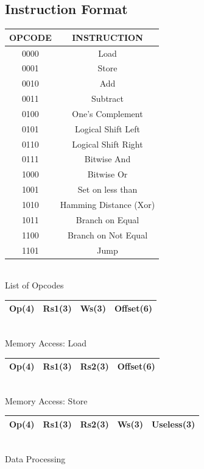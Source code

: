 \documentclass[conference]{IEEEtran}
\begin{document}
\subsection{Instruction Format}
\vspace{5mm}
\begin{center}
\begin{tabular}{ |c|c| } 

 \hline
 OPCODE & INSTRUCTION \\ 
 \hline
 0000 & Load \\ 
 0001 & Store \\
 0010 & Add \\ 
 0011 & Subtract \\ 
 0100 & One's Complement \\ 
 0101 & Logical Shift Left \\ 
 0110 & Logical Shift Right \\ 
 0111 & Bitwise And \\ 
 1000 & Bitwise Or \\ 
 1001 & Set on less than \\ 
 1010 & Hamming Distance (Xor) \\ 
 1011 & Branch on Equal \\ 
 1100 & Branch on Not Equal \\ 
 1101 & Jump \\ 
 \hline
\end{tabular}
\vspace{2mm}
\\List of Opcodes
\end{center}
\vspace{5mm}
\begin{center}
\begin{tabular}{ |c|c|c|c| } 
 \hline
 Op(4) & Rs1(3) & Ws(3) & Offset(6)\\
 \hline
\end{tabular}
\\Memory Access: Load
\end{center}
\vspace{5mm}
\begin{center}
\begin{tabular}{ |c|c|c|c| } 
 \hline
 Op(4) & Rs1(3) & Rs2(3) & Offset(6)\\
 \hline
\end{tabular}
\\Memory Access: Store
\end{center}
\vspace{5mm}
\begin{center}
\begin{tabular}{ |c|c|c|c|c| } 
 \hline
 Op(4) & Rs1(3) & Rs2(3) & Ws(3) & Useless(3)\\
 \hline
\end{tabular}
\\Data Processing
\end{center}
\end{document}
